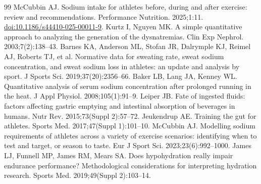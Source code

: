 \documentclass[11pt,a4paper]{article}
\begin{document}
\begin{thebibliography}{99}
 McCubbin AJ. Sodium intake for athletes before, during and after exercise: review and recommendations. Performance Nutrition. 2025;1:11. \href{https://doi.org/10.1186/s44410-025-00011-9}{doi:10.1186/s44410-025-00011-9}.
 Kurtz I, Nguyen MK. A simple quantitative approach to analyzing the generation of the dysnatremias. Clin Exp Nephrol. 2003;7(2):138--43.
 Barnes KA, Anderson ML, Stofan JR, Dalrymple KJ, Reimel AJ, Roberts TJ, et al. Normative data for sweating rate, sweat sodium concentration, and sweat sodium loss in athletes: an update and analysis by sport. J Sports Sci. 2019;37(20):2356--66.
 Baker LB, Lang JA, Kenney WL. Quantitative analysis of serum sodium concentration after prolonged running in the heat. J Appl Physiol. 2008;105(1):91--9.
 Leiper JB. Fate of ingested fluids: factors affecting gastric emptying and intestinal absorption of beverages in humans. Nutr Rev. 2015;73(Suppl 2):57--72.
 Jeukendrup AE. Training the gut for athletes. Sports Med. 2017;47(Suppl 1):101--10.
 McCubbin AJ. Modelling sodium requirements of athletes across a variety of exercise scenarios: identifying when to test and target, or season to taste. Eur J Sport Sci. 2023;23(6):992--1000.
 James LJ, Funnell MP, James RM, Mears SA. Does hypohydration really impair endurance performance? Methodological considerations for interpreting hydration research. Sports Med. 2019;49(Suppl 2):103--14.
\end{thebibliography}
\end{document}
